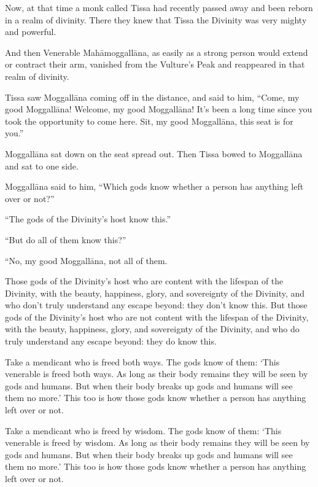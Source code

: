 \documentclass[12pt,openany]{book}%
\begin{document}
Now, at that time a monk called Tissa had recently passed away and been reborn in a realm of divinity. There they knew that Tissa the Divinity was very mighty and powerful. 

And then Venerable \textsanskrit{Mahāmoggallāna}, as easily as a strong person would extend or contract their arm, vanished from the Vulture’s Peak and reappeared in that realm of divinity. 

Tissa saw \textsanskrit{Moggallāna} coming off in the distance, and said to him, “Come, my good \textsanskrit{Moggallāna}! Welcome, my good \textsanskrit{Moggallāna}! It’s been a long time since you took the opportunity to come here. Sit, my good \textsanskrit{Moggallāna}, this seat is for you.” 

\textsanskrit{Moggallāna} sat down on the seat spread out. Then Tissa bowed to \textsanskrit{Moggallāna} and sat to one side. 

\textsanskrit{Moggallāna} said to him, “Which gods know whether a person has anything left over or not?” 

“The gods of the Divinity’s host know this.” 

“But do all of them know this?” 

“No, my good \textsanskrit{Moggallāna}, not all of them. 

Those gods of the Divinity’s host who are content with the lifespan of the Divinity, with the beauty, happiness, glory, and sovereignty of the Divinity, and who don’t truly understand any escape beyond: they don’t know this. But those gods of the Divinity’s host who are not content with the lifespan of the Divinity, with the beauty, happiness, glory, and sovereignty of the Divinity, and who do truly understand any escape beyond: they do know this. 

Take a mendicant who is freed both ways. The gods know of them: ‘This venerable is freed both ways. As long as their body remains they will be seen by gods and humans. But when their body breaks up gods and humans will see them no more.’ This too is how those gods know whether a person has anything left over or not. 

Take a mendicant who is freed by wisdom. The gods know of them: ‘This venerable is freed by wisdom. As long as their body remains they will be seen by gods and humans. But when their body breaks up gods and humans will see them no more.’ This too is how those gods know whether a person has anything left over or not. 
\end{document}
